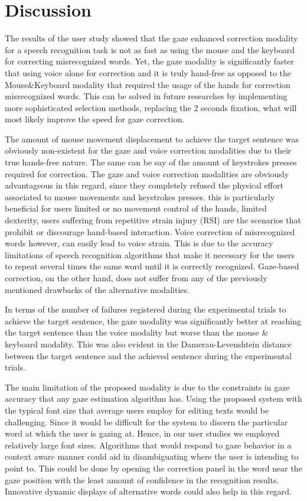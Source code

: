 \documentclass[]{article}
\begin{document}
\section{Discussion}
The results of the user study showed that the gaze enhanced correction modality for a speech recognition task is not
as fast as using the mouse and the keyboard for correcting misrecognized words. Yet, the gaze modality is
significantly faster that using voice alone for correction and it is truly hand-free as opposed to the Mouse\&Keyboard
modality that required the usage of the hands for correction misrecognized words. This can be solved in future researches
by implementing more sophisticated selection methods, replacing the 2 seconds fixation, what will most likely improve
the speed for gaze correction.


The amount of mouse movement displacement to achieve the target sentence was obviously non-existent for the gaze and
voice correction modalities due to their true hands-free nature. The same can be say of the amount of keystrokes presses
required for correction. The gaze and voice correction modalities are obviously advantageous in this regard, since they
completely refused the physical effort associated to mouse movements and keystrokes presses. this is particularly
beneficial for users limited or no movement control of the hands, limited dexterity, users suffering from
repetitive strain injury (RSI) are the scenarios that prohibit or discourage hand-based interaction. Voice correction of
misrecognized words however, can easily lead to voice strain. This is due to the accuracy limitations of speech
recognition algorithms that make it necessary for the users to repeat several times the same word  until it is correctly
recognized. Gaze-based correction, on the other hand, does not suffer from any of the previously mentioned drawbacks of
the alternative modalities.


In terms of the number of failures registered during the experimental trials to achieve the target sentence, the gaze
modality was significantly better at reaching the target sentence than the voice modality but worse than the mouse \&
keyboard modality. This was also evident in the Damerau-Levenshtein distance between the target sentence and the achieved sentence during
the experimental trials.


The main limitation of the proposed modality is due to the constraints in gaze accuracy that any gaze estimation
algorithm  has. Using the proposed system with the typical font size  that average users employ for editing texts  would
be challenging. Since it would be difficult for the system to discern the particular word at which the user is gazing
at. Hence, in our user studies we employed relatively large font sizes. Algorithms that would respond to gaze behavior
in a context aware manner could aid in disambiguating where the user is intending to point to. This could be done by
opening the correction panel in the word near the gaze position with the least amount of confidence in the
recognition results. Innovative dynamic displays of alternative words could also help in this regard.
\end{document}
